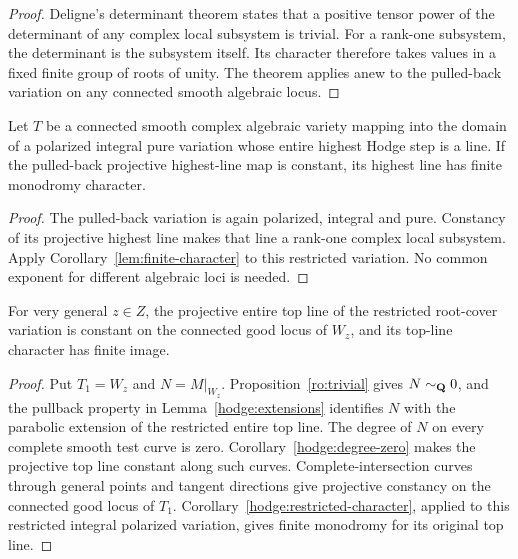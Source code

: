 \begin{proof}
Deligne's determinant theorem
\cite[Corollary~4.2.8(iii)(b)]{Deligne71} states that a positive tensor
power of the determinant of any complex local subsystem is trivial.
For a rank-one subsystem, the determinant is the subsystem itself.
Its character therefore takes values in a fixed finite group of roots
of unity. The theorem applies anew to the pulled-back variation on
any connected smooth algebraic locus.
\end{proof}

\begin{corollary}
\label{hodge:restricted-character}
Let $T$ be a connected smooth complex algebraic variety mapping into
the domain of a polarized integral pure variation whose entire highest
Hodge step is a line. If the pulled-back projective highest-line map is
constant, its highest line has finite monodromy character.
\end{corollary}
\begin{proof}
The pulled-back variation is again polarized, integral and pure.
Constancy of its projective highest line makes that line a rank-one
complex local subsystem. Apply Corollary~\ref{lem:finite-character}
to this restricted variation. No common exponent for different
algebraic loci is needed.
\end{proof}

\begin{corollary}
\label{ro:flat-character}
For very general $z\in Z$, the projective entire top line of the
restricted root-cover variation is constant on the connected good
locus of $W_z$, and its top-line character has finite image.
\end{corollary}

\begin{proof}
Put $T_1=W_z$ and $N=M|_{W_z}$. Proposition~\ref{ro:trivial}
gives $N\sim_{\mathbf Q}0$, and the pullback property in
Lemma~\ref{hodge:extensions} identifies $N$ with the parabolic
extension of the restricted entire top line.
The degree of $N$ on every complete smooth test curve is zero.
Corollary~\ref{hodge:degree-zero} makes the projective top line constant
along such curves.  Complete-intersection curves through general
points and tangent directions give projective constancy on the
connected good locus of $T_1$.
Corollary~\ref{hodge:restricted-character}, applied to this
restricted integral polarized variation, gives finite monodromy for
its original top line.
\end{proof}

